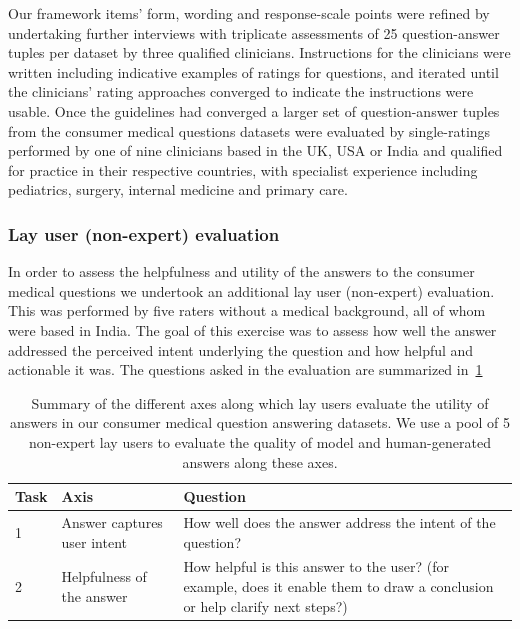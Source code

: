 \documentclass[10pt, letter, onecolumn]{arxiv}
\begin{document}
\begin{refsection}
Our framework items' form, wording and response-scale points were refined by undertaking further interviews with triplicate assessments of 25 question-answer tuples per dataset by three qualified clinicians. Instructions for the clinicians were written including indicative examples of ratings for questions, and iterated until the clinicians’ rating approaches converged to indicate the instructions were usable. Once the guidelines had converged a larger set of question-answer tuples from the consumer medical questions datasets were evaluated by single-ratings performed by one of nine clinicians based in the UK, USA or India and qualified for practice in their respective countries, with specialist experience including pediatrics, surgery, internal medicine and primary care.



\subsubsection{Lay user (non-expert) evaluation}
In order to assess the helpfulness and utility of the answers to the consumer medical questions we undertook an additional lay user (non-expert) evaluation. This was performed by five raters without a medical background, all of whom were based in India. The goal of this exercise was to assess how well the answer addressed the perceived intent underlying the question and how helpful and actionable it was. The questions asked in the evaluation are summarized in~\cref{tab:human-eval}

\begin{table}[]
\small
\centering
\caption{Summary of the different axes along which lay users evaluate the utility of answers in our consumer medical question answering datasets. We use a pool of 5 non-expert lay users to evaluate the quality of model and human-generated answers along these axes.}
\vspace{3pt}
\label{tab:human-eval}
\begin{tabular}{llp{}}
\toprule
  \textbf{Task} &        
  \textbf{Axis} &
  \textbf{Question} \\ \hline
1 &
  Answer captures user intent &
  How well does the answer address the intent of the question? \\ \hline
2 &
  Helpfulness of the answer &
  How helpful is this answer to the user? (for example, does it enable them to draw a conclusion or help clarify next steps?) \\
  \bottomrule
\end{tabular}
\end{table}



\end{refsection}
\end{document}
